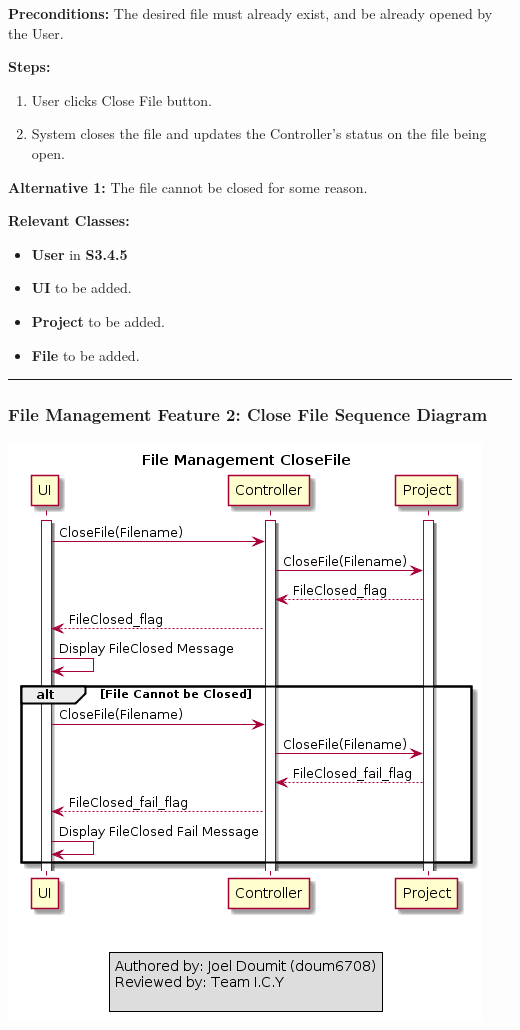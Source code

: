 \documentclass[twoside,letterpaper]{article}
\begin{document}
\noindent\textbf{Preconditions:} The desired file must already exist, and be already opened by the User. \newline

\noindent\textbf{Steps:}
\begin{enumerate}
	\item User clicks Close File button.
	\item System closes the file and updates the Controller's status on the file being open.
\end{enumerate}

\noindent\textbf{Alternative 1:} The file cannot be closed for some reason. \newline

\noindent\textbf{Relevant Classes:}
\begin{itemize}
	\item \textbf{User} in \textbf{S3.4.5}
	\item \textbf{UI} to be added.
	\item \textbf{Project} to be added.
	\item \textbf{File} to be added.
\end{itemize}
\vspace{8pt}
\hrule

\newpage

\subsubsection[File Management Feature 2: Close File Sequence Diagram]{\rmfamily\bfseries\color{black}
	File Management Feature 2: Close File Sequence Diagram}
\hypertarget{RefHeading22059017292}{}

\includegraphics[width=\textwidth]{images/SequenceDiagrams/FM_FileClose_Image}
\end{document}
